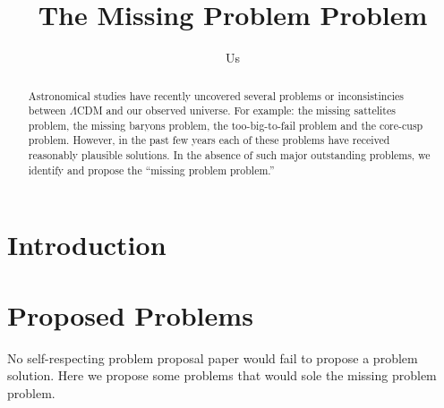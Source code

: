 \documentclass{aastex62}
\begin{document}
\title{The Missing Problem Problem}

\author{Us}

\begin{abstract}

Astronomical studies have recently uncovered several problems or
inconsistincies between $\Lambda$CDM and our observed universe. For example:
the missing sattelites problem, the missing baryons problem, the
too-big-to-fail problem and the core-cusp problem. However, in the past few
years each of these problems have received reasonably plausible solutions. In
the absence of such major outstanding problems, we identify and propose the
``missing problem problem.''

\end{abstract}


\section{Introduction} \label{sec:intro}



\section{Proposed Problems} \label{sec:prop}
No self-respecting problem proposal paper would fail to propose a problem
solution. Here we propose some problems that would sole the missing problem
problem.
\end{document}
